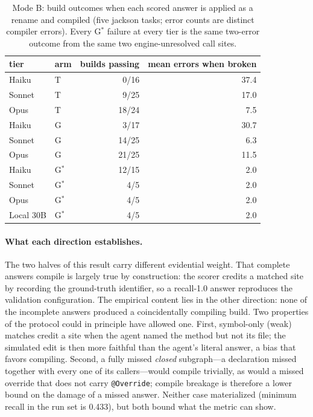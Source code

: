 \documentclass[11pt]{article}
\newcommand{\code}[1]{\texttt{#1}}
\newcommand{\gstar}{G$^{*}$}
\begin{document}
\begin{table}[ht]
\centering
\small
\begin{tabular}{llrr}
\toprule
tier & arm & builds passing & mean errors when broken \\
\midrule
Haiku  & T        & 0/16  & 37.4 \\
Sonnet & T        & 9/25  & 17.0 \\
Opus   & T        & 18/24 & 7.5 \\
\addlinespace
Haiku  & G        & 3/17  & 30.7 \\
Sonnet & G        & 14/25 & 6.3 \\
Opus   & G        & 21/25 & 11.5 \\
\addlinespace
Haiku  & \gstar{} & 12/15 & 2.0 \\
Sonnet & \gstar{} & 4/5   & 2.0 \\
Opus   & \gstar{} & 4/5   & 2.0 \\
Local 30B & \gstar{} & 4/5 & 2.0 \\
\bottomrule
\end{tabular}
\caption{Mode B: build outcomes when each scored answer is applied as a
rename and compiled (five jackson tasks; error counts are distinct compiler
errors). Every \gstar{} failure at every tier is the same two-error outcome
from the same two engine-unresolved call sites.}
\label{tab:modeb}
\end{table}

\paragraph{What each direction establishes.}
The two halves of this result carry different evidential weight. That
complete answers compile is largely true by construction: the scorer credits
a matched site by recording the ground-truth identifier, so a recall-1.0
answer reproduces the validation configuration. The empirical content lies
in the other direction: none of the incomplete answers produced a
coincidentally compiling build. Two properties of the protocol could in
principle have allowed one. First, symbol-only (weak) matches credit a site
when the agent named the method but not its file; the simulated edit is then
more faithful than the agent's literal answer, a bias that favors compiling.
Second, a fully missed \emph{closed} subgraph---a declaration missed
together with every one of its callers---would compile trivially, as would a
missed override that does not carry \code{@Override}; compile breakage is
therefore a lower bound on the damage of a missed answer. Neither case
materialized (minimum recall in the run set is 0.433), but both bound what
the metric can show.
\end{document}
